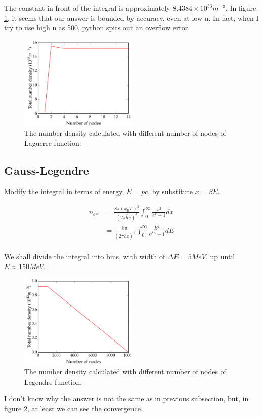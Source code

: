 \documentclass[11pt,letterpaper]{article}
\begin{document}
The constant in front of the integral is approximately $8.4384 \times 10^{33} m^{-3}$. In figure \ref{fig:NumDens}, it seems that our answer is bounded by accuracy, even at low n. In fact, when I try to use high n as 500, python spits out an overflow error.

\begin{figure}[h!]
	\centering
	\includegraphics[width=0.5\textwidth]{NumDens}
	\caption{The number density calculated with different number of nodes of Laguerre function.}
	\label{fig:NumDens}
\end{figure}

\subsection{Gauss-Legendre}

Modify the integral in terms of energy, $E=pc$, by substitute $x=\beta E$.

\begin{align*}
n_{e^{\pm}} &= \frac{8\pi(k_B T)^3}{(2\pi \bar{h} c)^3} \int_{0}^{\infty} \frac{x^2}{e^x+1}dx \\
                    &= \frac{8\pi}{(2\pi \bar{h} c)^3} \int_{0}^{\infty} \frac{E^2}{e^{\beta E}+1}dE \\
\end{align*}

We shall divide the integral into bins, with width of $\Delta E=5MeV$, up until $E \approx 150 MeV$.

\begin{figure}[h!]
	\centering
	\includegraphics[width=0.5\textwidth]{EnergyDens}
	\caption{The number density calculated with different number of nodes of Legendre function.}
	\label{fig:EnergyDens}
\end{figure}

I don't know why the answer is not the same as in previous subsection, but, in figure \ref{fig:EnergyDens}, at least we can see the convergence.
\end{document}
